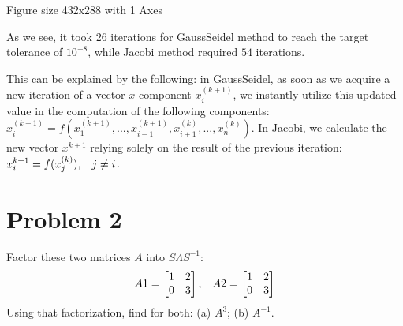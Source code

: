 \documentclass[letterpaper,10pt,english]{jupyterBook}
\begin{document}
\begin{sphinxVerbatim}[commandchars=\\\{\}]
\PYGZlt{}Figure size 432x288 with 1 Axes\PYGZgt{}
\end{sphinxVerbatim}

\sphinxAtStartPar
As we see, it took \(26\) iterations for Gauss\sphinxhyphen{}Seidel method to reach the target tolerance of \(10^{-8}\), while Jacobi method required \(54\) iterations.

\sphinxAtStartPar
This can be explained by the following: in Gauss\sphinxhyphen{}Seidel, as soon as we acquire a new iteration of a vector \(x\) component \(x_i^{(k+1)}\), we instantly utilize this updated value in the computation of the following components: \(x_i^{(k+1)} = f(x_1^{(k+1)}, ..., x_{i-1}^{(k+1)}, x_{i+1}^{(k)}, ..., x_n^{(k)})\). In Jacobi, we calculate the new vector \(x^{k+1}\) relying solely on the result of the previous iteration: \(x_i^{k+1} = f(x_j^{(k)}),\hspace{3mm}j \neq i\).


\section{Problem 2}
\label{\detokenize{notebooks/ProblemSet2:problem-2}}
\sphinxAtStartPar
Factor these two matrices \(A\) into \(S\Lambda S^{-1}\):
\begin{equation*}
\begin{split}
A1 = 
\begin{bmatrix}
1 & 2\\
0 & 3
\end{bmatrix}
,\hspace{3mm}
A2 =
\begin{bmatrix}
1 & 2\\
0 & 3
\end{bmatrix}
\end{split}
\end{equation*}
\sphinxAtStartPar
Using that factorization, find for both: (a) \(A^3\); (b) \(A^{-1}\).
\end{document}
